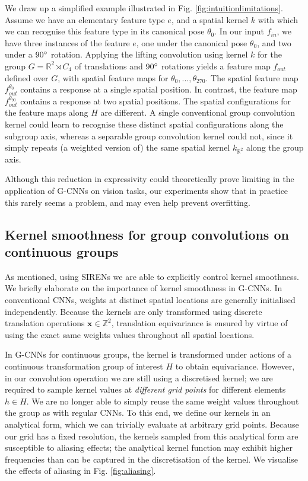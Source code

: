 \documentclass[nohyperref]{article}
\theoremstyle{plain}
\theoremstyle{definition}
\theoremstyle{remark}
\begin{document}
We draw up a simplified example illustrated in Fig. \ref{fig:intuitionlimitations}. Assume we have an elementary feature type $e$, and a spatial kernel $k$ with which we can recognise this feature type in its canonical pose $\theta_0$. In our input $f_{in}$, we have three instances of the feature $e$, one under the canonical pose $\theta_0$, and two under a $90\degree$ rotation. Applying the lifting convolution using kernel $k$ for the group $G=\mathbb{R}^2 \rtimes C_4$ of translations and $90\degree$ rotations yields a feature map $f_{out}$ defined over $G$, with spatial feature maps for $\theta_0, ..., \theta_{270}$. The spatial feature map $f^{\theta_0}_{out}$ contains a response at a single spatial position. In contrast, the feature map $f^{\theta_{90}}_{out}$ contains a response at two spatial positions. The spatial configurations for the feature maps along $H$ are different. A single conventional group convolution kernel could learn to recognise these distinct spatial configurations along the subgroup axis, whereas a separable group convolution kernel could not, since it simply repeats (a weighted version of) the same spatial kernel $k_{\mathbb{R}^2}$ along the group axis.

Although this reduction in expressivity could theoretically prove limiting in the application of G-CNNs on vision tasks, our experiments show that in practice this rarely seems a problem, and may even help prevent overfitting.

\subsection{Kernel smoothness for group convolutions on continuous groups}\label{app:kernelsmoothnesscontinuous}
As mentioned, using SIRENs we are able to explicitly control kernel smoothness. We briefly elaborate on the importance of kernel smoothness in G-CNNs. In conventional CNNs, weights at distinct spatial locations are generally initialised independently. Because the kernels are only transformed using discrete translation operations $\boldsymbol{x}\in \mathbb{Z}^2$, translation equivariance is ensured by virtue of using the exact same weights values throughout all spatial locations.

In G-CNNs for continuous groups, the kernel is transformed under actions of a continuous transformation group of interest $H$ to obtain equivariance. However, in our convolution operation we are still using a discretised kernel; we are required to sample kernel values at \textit{different grid points} for different elements $h\in H$. We are no longer able to simply reuse the same weight values throughout the group as with regular CNNs. To this end, we define our kernels in an analytical form, which we can trivially evaluate at arbitrary grid points. Because our grid has a fixed resolution, the kernels sampled from this analytical form are susceptible to aliasing effects; the analytical kernel function may exhibit higher frequencies than can be captured in the discretisation of the kernel. We visualise the effects of aliasing in Fig. \ref{fig:aliasing}.
\end{document}
